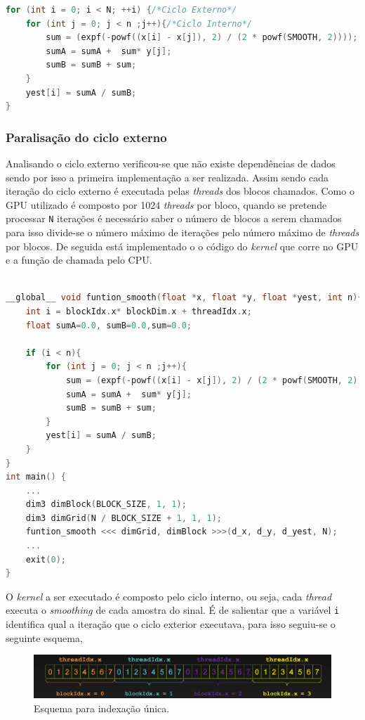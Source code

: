 \documentclass[11pt]{article}
\numberwithin{equation}{section}
\begin{document}
\begin{lstlisting}[language=C]
for (int i = 0; i < N; ++i) {/*Ciclo Externo*/
	for (int j = 0; j < n ;j++){/*Ciclo Interno*/
		sum = (expf(-powf((x[i] - x[j]), 2) / (2 * powf(SMOOTH, 2))));
		sumA = sumA +  sum* y[j];
		sumB = sumB + sum;
	}
	yest[i] = sumA / sumB;
}
\end{lstlisting}
 
\subsubsection{Paralisação do ciclo externo}
Analisando o ciclo externo verificou-se que não existe dependências de dados sendo por isso a primeira implementação a ser realizada.
Assim sendo cada iteração do ciclo externo é executada pelas \textit{threads} dos blocos chamados. Como o GPU utilizado é composto por 1024 \textit{threads} por bloco, quando se pretende processar \texttt{N} iterações é necessário saber o número de blocos a serem chamados para isso divide-se o número máximo de iterações pelo número máximo de \textit{threads} por blocos. De seguida está implementado o o código do \textit{kernel} que corre no GPU e a função de chamada pelo CPU.

\begin{lstlisting}[language=C]

__global__ void funtion_smooth(float *x, float *y, float *yest, int n){
	int i = blockIdx.x* blockDim.x + threadIdx.x;
	float sumA=0.0, sumB=0.0,sum=0.0;

	if (i < n){
		for (int j = 0; j < n ;j++){
			sum = (expf(-powf((x[i] - x[j]), 2) / (2 * powf(SMOOTH, 2))));
			sumA = sumA +  sum* y[j];
			sumB = sumB + sum;
		}
		yest[i] = sumA / sumB;
	}
}
int main() {
	...
	dim3 dimBlock(BLOCK_SIZE, 1, 1);
	dim3 dimGrid(N / BLOCK_SIZE + 1, 1, 1);
	funtion_smooth <<< dimGrid, dimBlock >>>(d_x, d_y, d_yest, N);
	...
	exit(0);
}
\end{lstlisting}

O \textit{kernel} a ser executado é composto pelo ciclo interno, ou seja, cada \textit{thread} executa o \textit{smoothing} de cada amostra do sinal. É de salientar que a variável \texttt{i} identifica qual a iteração que o ciclo exterior executava, para isso seguiu-se o seguinte esquema,

\begin{figure}[H]
	\centering
	\includegraphics[keepaspectratio=true, scale=0.6]{num_i}
	\vspace{-0.5em}
	\caption{Esquema para indexação única.}
	\vspace{-0.8em}
	\label{fig:imag of i}
\end{figure} 
\end{document}
